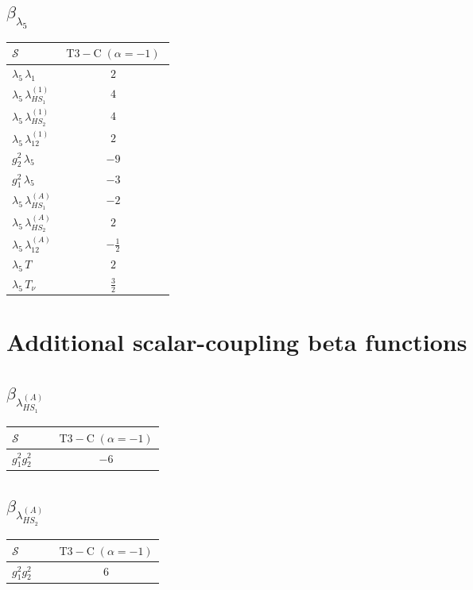 \documentclass[9pt]{article}
\begin{document}
\subsection*{$ \beta_{\lambda_5} $}
\begin{longtable}{@{}p{0.31\linewidth}c@{}}
\toprule
$\mathcal{S}$ & $ \mathrm{T3-C}\;(\alpha=-1) $ \\
\midrule
$ \lambda_5\,\lambda_1 $ & $ 2 $ \\
$ \lambda_5\,\lambda_{HS_1}^{(1)} $ & $ 4 $ \\
$ \lambda_5\,\lambda_{HS_2}^{(1)} $ & $ 4 $ \\
$ \lambda_5\,\lambda_{12}^{(1)} $ & $ 2 $ \\
$ g_2^2\,\lambda_5 $ & $ -9 $ \\
$ g_1^2\,\lambda_5 $ & $ -3 $ \\
$ \lambda_5\,\lambda_{HS_1}^{(A)} $ & $ -2 $ \\
$ \lambda_5\,\lambda_{HS_2}^{(A)} $ & $ 2 $ \\
$ \lambda_5\,\lambda_{12}^{(A)} $ & $ - \frac{1}{2} $ \\
$ \lambda_5\,T $ & $ 2 $ \\
$ \lambda_5\,T_\nu $ & $ \frac{3}{2} $ \\
\bottomrule
\end{longtable}
\section*{Additional scalar-coupling beta functions}
\subsection*{$ \beta_{\lambda_{HS_1}^{(A)}} $}
\begin{longtable}{@{}p{0.31\linewidth}c@{}}
\toprule
$\mathcal{S}$ & $ \mathrm{T3-C}\;(\alpha=-1) $ \\
\midrule
$ g_1^2g_2^2 $ & $ -6 $ \\
\bottomrule
\end{longtable}
\subsection*{$ \beta_{\lambda_{HS_2}^{(A)}} $}
\begin{longtable}{@{}p{0.31\linewidth}c@{}}
\toprule
$\mathcal{S}$ & $ \mathrm{T3-C}\;(\alpha=-1) $ \\
\midrule
$ g_1^2g_2^2 $ & $ 6 $ \\
\bottomrule
\end{longtable}
\end{document}
